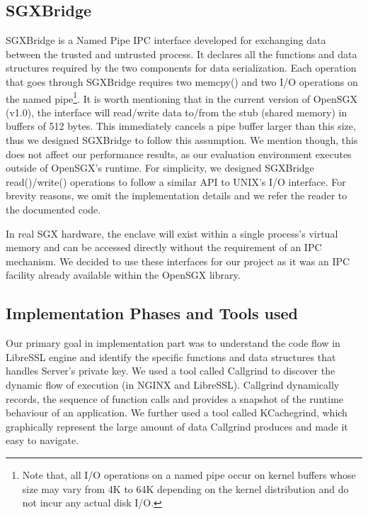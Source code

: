 \documentclass[../main.tex]{subfiles}
\begin{document}
%

\subsection{SGXBridge}
\label{subsec:sgxbridge}

SGXBridge is a Named Pipe IPC interface developed for exchanging data between
the trusted and untrusted process. It declares all the functions and data
structures required by the two components for data serialization. Each operation
that goes through SGXBridge requires two memcpy() and two I/O operations on the
named pipe\footnote{Note that, all I/O operations on a named pipe occur on
kernel buffers whose size may vary from 4K to 64K depending on the kernel
distribution and do not incur any actual disk I/O.}. It is worth mentioning
that in the current version of OpenSGX (v1.0), the interface will read/write
data to/from the stub (shared memory) in buffers of 512 bytes. This immediately
cancels a pipe buffer larger than this size, thus we designed SGXBridge to
follow this assumption. We mention though, this does not affect our performance
results, as our evaluation environment executes outside of OpenSGX's
runtime. For simplicity, we designed SGXBridge read()/write() operations to
follow a similar API to UNIX's I/O interface. For brevity reasons, we omit the
implementation details and we refer the reader to the documented code.

In real SGX hardware, the enclave will exist within a single process's virtual
memory and can be accessed directly without the requirement of an IPC
mechanism. We decided to use these interfaces for our project as it was an IPC
facility already available within the OpenSGX library.

\subsection{Implementation Phases and Tools used}
\label{subsec:Implementation Phases and Tools used}
Our primary goal in implementation part was to understand the code flow in LibreSSL
engine and identify the specific functions and data structures that handles Server’s 
private key. We used a tool called Callgrind to discover the dynamic flow of execution 
(in NGINX and LibreSSL). Callgrind dynamically records, the sequence of function calls 
and provides a snapshot of the runtime behaviour of an application. We further used a
tool called KCachegrind, which graphically represent the large amount of data 
Callgrind produces and made it easy to navigate.
 
\end{document}
